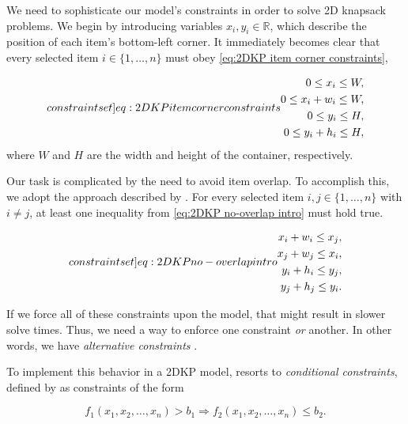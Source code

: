We need to sophisticate our model's constraints in order to solve 2D knapsack problems. We begin by introducing variables $x_i, y_i \in \mathbb{R}$, which describe the position of each item's bottom-left corner. It immediately becomes clear that every selected item $i \in \{1,\dots,n\}$ must obey \cref{eq:2DKP item corner constraints},

\begin{align}
    \label[constraint set]{eq:2DKP item corner constraints}
    \begin{split}
        0 \leq x_i \leq W,\\
        0 \leq x_i + w_i \leq W,\\
        0 \leq y_i \leq H,\\
        0 \leq y_i + h_i \leq H,
    \end{split}
\end{align}
where $W$ and $H$ are the width and height of the container, respectively.

Our task is complicated by the need to avoid item overlap. To accomplish this, we adopt the approach described by \textcite{KALVELAGEN2021}. For every selected item $i, j \in \{1,\dots,n\}$ with $i \neq j$, at least one inequality from \cref{eq:2DKP no-overlap intro} must hold true.

\begin{align}
    \label[constraint set]{eq:2DKP no-overlap intro}
    \begin{split}
        x_i + w_i \leq x_j,\\
        x_j + w_j \leq x_i,\\
        y_i + h_i \leq y_j,\\
        y_j + h_j \leq y_i.
    \end{split}
\end{align}

If we force all of these constraints upon the model, that might result in slower solve times. Thus, we need a way to enforce one constraint \emph{or} another. In other words, we have \emph{alternative constraints} \cite{BRADLEY1977}.

To implement this behavior in a 2DKP model, \textcite{KALVELAGEN2021} resorts to \emph{conditional constraints}, defined by \textcite{BRADLEY1977} as constraints of the form

\begin{equation}
    f_1(x_1,x_2,\dots,x_n) > b_1 \Rightarrow f_2(x_1,x_2,\dots,x_n) \leq b_2.
\end{equation}

